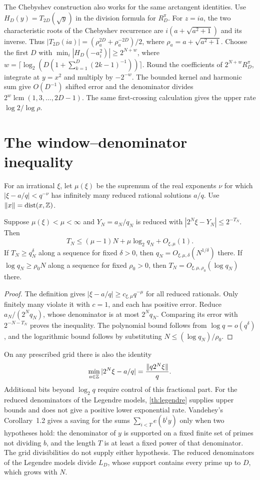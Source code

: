 \documentclass[11pt]{article}
\DeclareMathOperator{\lcm}{lcm}
\DeclareMathOperator{\dist}{dist}
\begin{document}
The Chebyshev construction also works for the same arctangent identities. Use $H_D(y)=T_{2D}(\sqrt y)$ in the division formula for $R_D^\pi$. For $z=ia$, the two characteristic roots of the Chebyshev recurrence are $i(a+\sqrt{a^2+1})$ and its inverse. Thus
$|T_{2D}(ia)|=(\rho_a^{2D}+\rho_a^{-2D})/2$, where $\rho_a=a+\sqrt{a^2+1}$. Choose the first $D$ with $\min_i|H_D(-a_i^2)|\ge2^{N+w}$, where $w=\lceil\log_2(D(1+\sum_{k=1}^D(2k-1)^{-1}))\rceil$. Round the coefficients of $2^{N+w}R_D^\pi$, integrate at $y=x^2$ and multiply by $-2^{-w}$. The bounded kernel and harmonic sum give $O(D^{-1})$ shifted error and the denominator divides $2^w\lcm(1,3,\ldots,2D-1)$. The same first-crossing calculation gives the upper rate $\log 2/\log\rho$.

\section{The window--denominator inequality}\label{sec:barrier}

For an irrational $\xi$, let $\mu(\xi)$ be the supremum of the real exponents $\nu$ for which $|\xi-a/q|<q^{-\nu}$ has infinitely many reduced rational solutions $a/q$. Use $\|x\|=\dist(x,\Z)$.

\begin{theorem}\label{th:barrier}
Suppose $\mu(\xi)<\mu<\infty$ and $Y_N=a_N/q_N$ is reduced with
$|2^N\xi-Y_N|\le2^{-T_N}$. Then
\[
 T_N\le(\mu-1)N+\mu\log_2 q_N+O_{\xi,\mu}(1).
\]
If $T_N\ge q_N^\delta$ along a sequence for fixed $\delta>0$, then $q_N=O_{\xi,\mu,\delta}(N^{1/\delta})$ there. If $\log q_N\ge\rho_0N$ along a sequence for fixed $\rho_0>0$, then $T_N=O_{\xi,\mu,\rho_0}(\log q_N)$ there.
\end{theorem}
\begin{proof}
The definition gives $|\xi-a/q|\ge c_{\xi,\mu}q^{-\mu}$ for all reduced rationals. Only finitely many violate it with $c=1$, and each has positive error. Reduce $a_N/(2^Nq_N)$, whose denominator is at most $2^Nq_N$. Comparing its error with $2^{-N-T_N}$ proves the inequality. The polynomial bound follows from $\log q=o(q^\delta)$, and the logarithmic bound follows by substituting $N\le(\log q_N)/\rho_0$.
\end{proof}

On any prescribed grid there is also the identity
\[
 \min_{a\in\mathbb Z}|2^N\xi-a/q|=\frac{\|q2^N\xi\|}{q}.
\]
Additional bits beyond $\log_2 q$ require control of this fractional part. For the reduced denominators of the Legendre models, \cref{th:legendre} supplies upper bounds and does not give a positive lower exponential rate. Vandehey's Corollary~1.2 \cite{vandehey} gives a saving for the sums $\sum_{i<T}e(b^iy)$ only when two hypotheses hold: the denominator of $y$ is supported on a fixed finite set of primes not dividing $b$, and the length $T$ is at least a fixed power of that denominator. The grid divisibilities do not supply either hypothesis. The reduced denominators of the Legendre models divide $L_D$, whose support contains every prime up to $D$, which grows with $N$.
\end{document}
